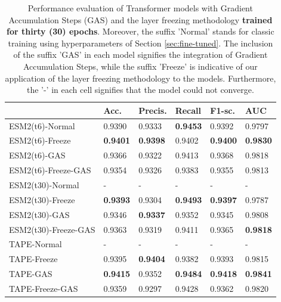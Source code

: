 \begin{table}[]
	\centering
	\caption{Performance evaluation of Transformer models with Gradient Accumulation Steps (GAS) and the layer freezing methodology \textbf{trained for thirty (30) epochs}. Moreover, the suffix 'Normal' stands for classic training using hyperparameters of Section \ref{sec:fine-tuned}. The inclusion of the suffix 'GAS' in each model signifies the integration of Gradient Accumulation Steps, while the suffix 'Freeze' is indicative of our application of the layer freezing methodology to the models. Furthermore, the '-' in each cell signifies that the model could not converge.}
	\label{tab:comparison}
	\tiny
	\begin{tabular}{llllll} \hline
		\textbf{}            & \textbf{Acc.} & \textbf{Precis.} & \textbf{Recall} & \textbf{F1-sc.} & \textbf{AUC}      \\ \hline
		ESM2(t6)-Normal             & 0.9390            & 0.9333             & \textbf{0.9453} & 0.9392            & 0.9797                    \\
		
		ESM2(t6)-Freeze      & \textbf{0.9401}   & \textbf{0.9398}    & 0.9402          & \textbf{0.9400}   & \textbf{0.9830}          \\
		ESM2(t6)-GAS         & 0.9366            & 0.9322             & 0.9413          & 0.9368            & 0.9818                           \\
		ESM2(t6)-Freeze-GAS  & 0.9354            & 0.9326             & 0.9383          & 0.9355            & 0.9813                             \\ \hline
		ESM2(t30)-Normal            & -                 & -                  & -               & -                 & -                                    \\
		ESM2(t30)-Freeze     & \textbf{0.9393}   & 0.9304             & \textbf{0.9493} & \textbf{0.9397}   & 0.9787                      \\
		ESM2(t30)-GAS        & 0.9346            & \textbf{0.9337}    & 0.9352          & 0.9345            & 0.9808                            \\
		ESM2(t30)-Freeze-GAS & 0.9363            & 0.9319             & 0.9411          & 0.9365            & \textbf{0.9818}                     \\ \hline
		TAPE-Normal                 & -                 & -                  & -               & -                 & -                              \\
		TAPE-Freeze          & 0.9395            & \textbf{0.9404}    & 0.9382          & 0.9393            & 0.9815                           \\
		TAPE-GAS             & \textbf{0.9415}   & 0.9352             & \textbf{0.9484} & \textbf{0.9418}   & \textbf{0.9841}            \\
		TAPE-Freeze-GAS      & 0.9359            & 0.9297             & 0.9428          & 0.9362            & 0.9820                    \\ \hline    
	\end{tabular}
\end{table}


